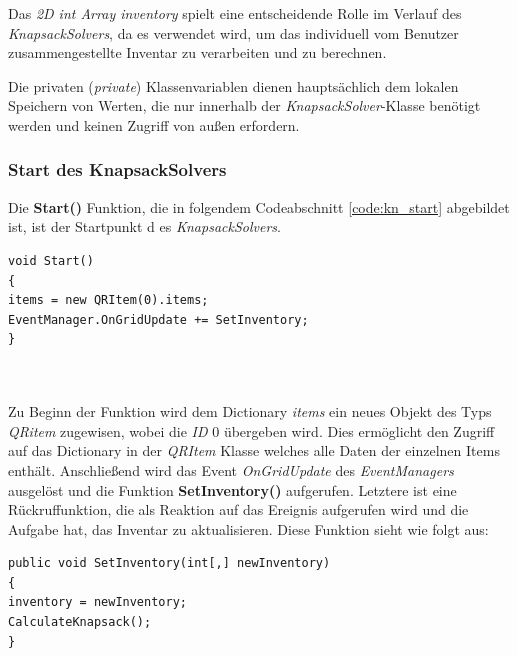 Das \textit{2D int Array inventory} spielt eine entscheidende Rolle im Verlauf des \textit{KnapsackSolvers}, da es verwendet
wird, um das individuell vom Benutzer zusammengestellte Inventar zu verarbeiten und zu berechnen.

Die privaten (\textit{private}) Klassenvariablen dienen hauptsächlich dem lokalen Speichern von Werten, die nur innerhalb
der \textit{KnapsackSolver}-Klasse benötigt werden und keinen Zugriff von außen erfordern.

\subsubsection{Start des KnapsackSolvers}
Die \textbf{Start()} Funktion, die in folgendem Codeabschnitt \ref{code:kn_start} abgebildet ist, ist der Startpunkt d
es \textit{KnapsackSolvers}.

\begin{lstlisting}[style=csharp, caption={Klassenvariablen der InventoryController Klasse}, label=code:kn_start]
void Start()
{
items = new QRItem(0).items;
EventManager.OnGridUpdate += SetInventory;
}
\end{lstlisting}\\
\\
Zu Beginn der Funktion wird dem Dictionary \textit{items} ein neues Objekt des Typs \textit{QRitem} zugewisen, wobei die
\textit{ID} 0 übergeben wird. Dies ermöglicht den Zugriff auf das Dictionary in der \textit{QRItem} Klasse welches alle
Daten der einzelnen Items enthält. Anschließend wird das Event \textit{OnGridUpdate} des \textit{EventManagers} ausgelöst
und die Funktion \textbf{SetInventory()} aufgerufen. Letztere ist eine Rückruffunktion, die als Reaktion auf das Ereignis
aufgerufen wird und die Aufgabe hat, das Inventar zu aktualisieren. Diese Funktion sieht wie folgt aus:
\begin{lstlisting}[style=csharp, caption={Inventar setzen}, label=code:kn_start]
public void SetInventory(int[,] newInventory)
{
inventory = newInventory;
CalculateKnapsack();
}
\end{lstlisting}

